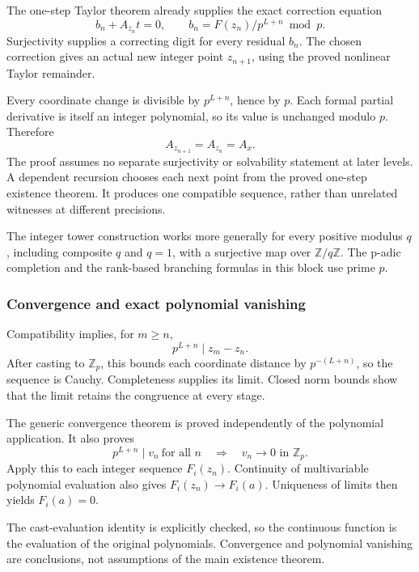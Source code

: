 The one-step Taylor theorem already supplies the exact correction
equation \[
b_n+A_{z_n}t=0,\qquad
b_n=F(z_n)/p^{L+n}\bmod p.
\] Surjectivity supplies a correcting digit for every residual \(b_n\).
The chosen correction gives an actual new integer point \(z_{n+1}\),
using the proved nonlinear Taylor remainder.

Every coordinate change is divisible by \(p^{L+n}\), hence by \(p\).
Each formal partial derivative is itself an integer polynomial, so its
value is unchanged modulo \(p\). Therefore \[
A_{z_{n+1}}=A_{z_n}=A_x.
\] The proof assumes no separate surjectivity or solvability statement
at later levels. A dependent recursion chooses each next point from the
proved one-step existence theorem. It produces one compatible sequence,
rather than unrelated witnesses at different precisions.

The integer tower construction works more generally for every positive
modulus \(q\), including composite \(q\) and \(q=1\), with a surjective
map over \(\mathbb Z/q\mathbb Z\). The p-adic completion and the
rank-based branching formulas in this block use prime \(p\).

\hypertarget{cont3:convergence-and-exact-polynomial-vanishing}{%
\subsubsection{Convergence and exact polynomial
vanishing}\label{cont3:convergence-and-exact-polynomial-vanishing}}

Compatibility implies, for \(m\ge n\), \[
p^{L+n}\mid z_m-z_n.
\] After casting to \(\mathbb Z_p\), this bounds each coordinate
distance by \(p^{-(L+n)}\), so the sequence is Cauchy. Completeness
supplies its limit. Closed norm bounds show that the limit retains the
congruence at every stage.

The generic convergence theorem is proved independently of the
polynomial application. It also proves \[
p^{L+n}\mid v_n\ \text{for all }n
\quad\Longrightarrow\quad v_n\longrightarrow0\text{ in }\mathbb Z_p.
\] Apply this to each integer sequence \(F_i(z_n)\). Continuity of
multivariable polynomial evaluation also gives \(F_i(z_n)\to F_i(a)\).
Uniqueness of limits then yields \(F_i(a)=0\).

The cast-evaluation identity is explicitly checked, so the continuous
function is the evaluation of the original polynomials. Convergence and
polynomial vanishing are conclusions, not assumptions of the main
existence theorem.


